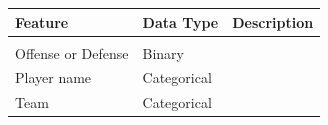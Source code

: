 \documentclass[]{article}
\begin{document}
\begin{longtable}[]{@{}lll@{}}
\toprule
\begin{minipage}[b]{0.32\columnwidth}\raggedright\strut
Feature\strut
\end{minipage} & \begin{minipage}[b]{0.13\columnwidth}\raggedright\strut
Data Type\strut
\end{minipage} & \begin{minipage}[b]{0.46\columnwidth}\raggedright\strut
Description\strut
\end{minipage}\tabularnewline
\midrule
\endhead
\begin{minipage}[t]{0.32\columnwidth}\raggedright\strut
\strut
\end{minipage} & \begin{minipage}[t]{0.13\columnwidth}\raggedright\strut
\strut
\end{minipage} & \begin{minipage}[t]{0.46\columnwidth}\raggedright\strut
\strut
\end{minipage}\tabularnewline
\begin{minipage}[t]{0.32\columnwidth}\raggedright\strut
Offense or Defense\strut
\end{minipage} & \begin{minipage}[t]{0.13\columnwidth}\raggedright\strut
Binary\strut
\end{minipage} & \begin{minipage}[t]{0.46\columnwidth}\raggedright\strut
\strut
\end{minipage}\tabularnewline
\begin{minipage}[t]{0.32\columnwidth}\raggedright\strut
Player name\strut
\end{minipage} & \begin{minipage}[t]{0.13\columnwidth}\raggedright\strut
Categorical\strut
\end{minipage} & \begin{minipage}[t]{0.46\columnwidth}\raggedright\strut
\strut
\end{minipage}\tabularnewline
\begin{minipage}[t]{0.32\columnwidth}\raggedright\strut
Team\strut
\end{minipage} & \begin{minipage}[t]{0.13\columnwidth}\raggedright\strut
Categorical\strut
\end{minipage} & \begin{minipage}[t]{0.46\columnwidth}\raggedright\strut
\strut
\end{minipage}\tabularnewline

\end{longtable}
\end{document}
